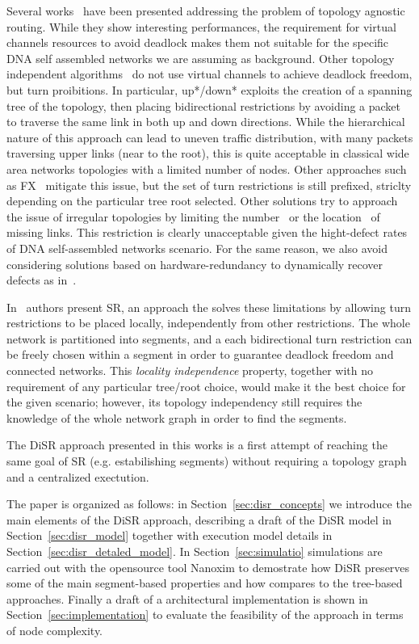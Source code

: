 Several works~\cite{sancho2002, skeie2002, skeie2004, koibuchi2003} have been presented addressing the problem of topology
agnostic routing. While they show interesting
performances, the requirement for virtual channels resources 
to avoid deadlock makes them not suitable for the specific DNA self
assembled networks we are assuming as background.
Other topology independent algorithms~\cite{schroeder1991, koibuchi2001, cherkasova1996} do not use virtual channels to
achieve deadlock freedom, but turn proibitions. 
In particular, up*/down* exploits the creation of a spanning tree of the
topology, then placing bidirectional restrictions by avoiding a packet
to traverse the same link in both up and down directions.
While the hierarchical nature of this approach can lead to uneven traffic
distribution, with many packets traversing upper links (near to the
root), this is quite acceptable in classical wide area networks
topologies with a limited number of nodes. Other approaches such as
FX~\cite{sancho2000} mitigate this
issue, but the set of turn restrictions is still prefixed,
striclty depending on the particular tree root selected. 
Other solutions try to approach the issue of irregular
topologies by limiting the number~\cite{dally1994, duato1997, gomez2004, koibuchi2008} or the
location~\cite{zhang2008, sui2000, flich2008, liu2011} of missing links. This
restriction is clearly unacceptable given the hight-defect rates of
DNA self-assembled networks scenario. For the same reason, we also
avoid considering solutions based on hardware-redundancy to
dynamically recover defects as in~\cite{constantinides2006, kohler2010, kim2006, park2006}. 

In~\cite{mejia_ipdps06} authors present SR, an approach the solves these
limitations by allowing turn restrictions to be placed locally,
independently from other restrictions. The whole network is
partitioned into segments, and a each bidirectional turn
restriction can be freely chosen within a segment in order to guarantee
deadlock freedom and connected networks. This \emph{locality
independence} property, together with no requirement of any particular tree/root
choice, would make it the best choice for the given scenario;
however, its topology independency still requires the knowledge of the
whole network graph in order to find the segments. 

The DiSR approach presented in this works is a first attempt of
reaching the same goal of SR (e.g. estabilishing segments) without
requiring a topology graph and a centralized exectution.

The paper is organized as follows: in Section~\ref{sec:disr_concepts}
we introduce the main elements of the DiSR approach, describing  
a draft of the DiSR model in Section~\ref{sec:disr_model}
together with execution model details in Section~\ref{sec:disr_detaled_model}.
In Section~\ref{sec:simulatio} simulations are carried out with the opensource tool Nanoxim
to demostrate how DiSR preserves some of the main segment-based
properties and how compares to the tree-based approaches. Finally a
draft of a architectural implementation is shown in
Section~\ref{sec:implementation} to evaluate the feasibility of the
approach in terms of node complexity.


